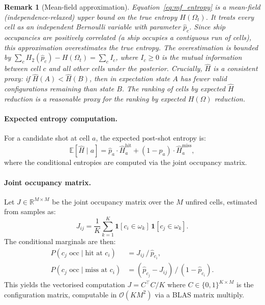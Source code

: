 \documentclass[12pt,a4paper]{article}
\newtheorem{remark}{Remark}
\newcommand{\E}{\mathbb{E}}
\newcommand{\R}{\mathbb{R}}
\newcommand{\1}{\mathbf{1}}
\newcommand{\Hb}{H_2}
\newcommand{\bigo}{\mathcal{O}}
\begin{document}
\begin{remark}[Mean-field approximation]
  Equation~\eqref{eq:mf_entropy} is a \emph{mean-field} (independence-relaxed)
  upper bound on the true entropy $H(\Omega_t)$.  It treats every cell as an
  independent Bernoulli variable with parameter $\hat{p}_c$.  Since ship
  occupancies are positively correlated (a ship occupies a contiguous run of
  cells), this approximation \emph{overestimates} the true entropy.  The
  overestimation is bounded by $\sum_c \Hb(\hat{p}_c) - H(\Omega_t)
  = \sum_c I_c$, where $I_c \geq 0$ is the mutual information between cell $c$
  and all other cells under the posterior.  Crucially, $\hat{H}$ is a
  \emph{consistent proxy}: if $\hat{H}(A) < \hat{H}(B)$, then in expectation
  state $A$ has fewer valid configurations remaining than state $B$.  The
  ranking of cells by expected $\hat{H}$ reduction is a reasonable proxy for the
  ranking by expected $H(\Omega)$ reduction.
\end{remark}

\paragraph{Expected entropy computation.}
For a candidate shot at cell $a$, the expected post-shot entropy is:
\begin{equation}
  \E[\hat{H} \mid a]
  = \hat{p}_a \cdot \hat{H}^{\text{hit}}_a
  + (1-\hat{p}_a) \cdot \hat{H}^{\text{miss}}_a,
  \label{eq:expected_H}
\end{equation}
where the conditional entropies are computed via the joint occupancy matrix.

\paragraph{Joint occupancy matrix.}
Let $J \in \R^{M \times M}$ be the joint occupancy matrix over the $M$ unfired
cells, estimated from samples as:
\begin{equation}
  J_{ij} = \frac{1}{K}\sum_{k=1}^K \1[c_i \in \omega_k]\,\1[c_j \in \omega_k].
\end{equation}
The conditional marginals are then:
\begin{align}
  P(c_j \text{ occ} \mid \text{hit at } c_i)  &= J_{ij}\,/\,\hat{p}_{c_i}, \\
  P(c_j \text{ occ} \mid \text{miss at } c_i) &= (\hat{p}_{c_j} - J_{ij})\,/\,(1 - \hat{p}_{c_i}).
\end{align}
This yields the vectorised computation
$J = C^{\top}C/K$ where $C \in \{0,1\}^{K\times M}$ is the configuration matrix,
computable in $\bigo(KM^2)$ via a BLAS matrix multiply.
\end{document}
